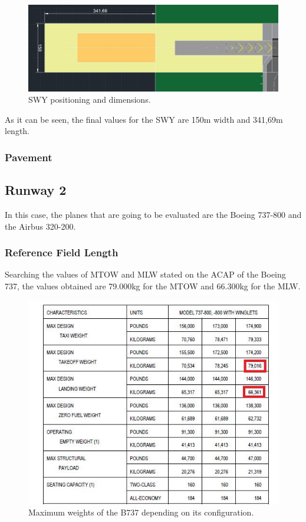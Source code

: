 			\begin{figure}[H]
				\centering
				\includegraphics[clip, trim=0cm 0cm 0cm 0cm, width=1\textwidth]{./images/declareddistances/SWY}
				\caption{SWY positioning and dimensions.} %
				\label{} %
			\end{figure}
		
			As it can be seen, the final values for the SWY are 150m width and 341,69m length.
			
			\subsubsection{Pavement}
			

		\subsection{Runway 2}
		In this case, the planes that are going to be evaluated are the Boeing 737-800 and the Airbus 320-200.
		\subsubsection{Reference Field Length}
		Searching the values of MTOW and MLW stated on the ACAP of the Boeing 737, the values obtained are 79.000kg for the MTOW and 66.300kg for the MLW.
		
		\begin{figure}[H]
			\centering
			\includegraphics[clip, trim=0cm 0cm 0cm 0cm, width=1\textwidth]{./images/B737/B737MTOW}
			\caption{Maximum weights of the B737 depending on its configuration.} %
			\label{} %
		\end{figure}
	
